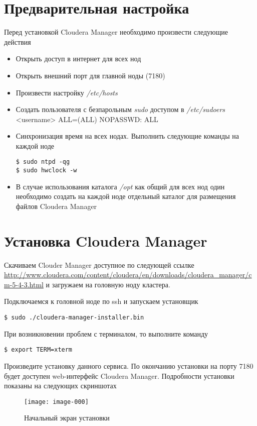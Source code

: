 \section{Предварительная настройка}
Перед установкой Cloudera Manager необходимо произвести следующие действия
\begin{itemize}
    \item Открыть доступ в интернет для всех нод
    \item Открыть внешний порт для главной ноды (7180)
    \item Произвести настройку \emph{/etc/hosts}
    \item Создать пользователя с безпарольным \emph{sudo} доступом в \emph{/etc/sudoers}\\
        <username> ALL=(ALL) NOPASSWD: ALL
    \item Синхронизация время на всех нодах. Выполнить следующие команды на каждой ноде
\begin{lstlisting}
$ sudo ntpd -qg
$ sudo hwclock -w
\end{lstlisting}
    \item В случае использования каталога \emph{/opt} как общий для всех нод один необходимо
    создать на каждой ноде отдельный каталог для размещения файлов Cloudera Manager
\end{itemize}

\newpage

\section{Установка Cloudera Manager}
Скачиваем Clouder Manager доступное по следующей ссылке 
\url{http://www.cloudera.com/content/cloudera/en/downloads/cloudera_manager/cm-5-4-3.html} и 
загружаем на головную ноду кластера.

Подключаемся к головной ноде по ssh и запускаем установщик
\begin{lstlisting}
$ sudo ./cloudera-manager-installer.bin
\end{lstlisting}

При возникновении проблем с терминалом, то выполните команду
\begin{lstlisting}
$ export TERM=xterm
\end{lstlisting}

Произведите установку данного сервиса. По окончанию установки на порту 7180 будет доступен web-интерфейс 
Cloudera Manager. Подробности установки показаны на следующих скриншотах

\begin{figure}[ht!]
    \center
    \texttt{[image: image-000]}
    \caption{Начальный экран установки}
\end{figure}

